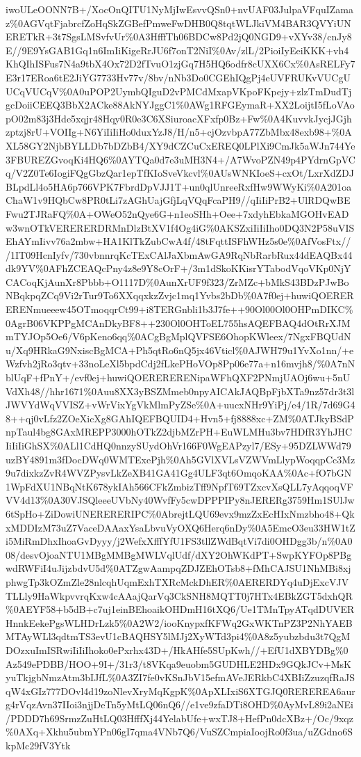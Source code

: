 \documentclass[]{article}
\begin{document}
iwoULeOONN7B+/XocOnQITU1NyMjIwEsvvQSn0+nvUAF03JulpaVFquIZamaz\%0AGVqtFjabrcfZoHqSkZGBefPmweFwDHB0Q8tqtWLJkiVM4BAR3QVYiUNERETkR+3t7SgsLMSvfvUr\%0A3HfffTh06BDCw8Pd2jQ0NGD9+vXYv38/cnJy8E//9E9YsGAB1Gq1n6ImIiKigeRrJU6f7onT2NiI\%0Av/zlL/2PioiIyEeiKKK+vh4KhQIhISFus7N4a9tbX4Ox72D2fTvuO1zjGq7H5HQ6odfr8cUXX6Cx\%0AsRELFy7E3r17ERoa6tE2JiYG7733Hv77v/8bv/nNb3Do0CGEhIQgPj4eUVFRUKvVUCgUUCqVUCqV\%0A0uPOP2UymbQIguD2vPMCdMxapVKpoFKpejy+zlzTmDudTjgcDoiiCEEQ3BbX2ACke88AkNYJggC1\%0AWg1RFGEymaR+XX2LoijtI5fLoVAopO02m83j3Hde5xqjr48Hqy0R0e3C6XSiuroacXFxfp0Bz+Fw\%0A4KuvvkJycjJGjhzptzj8rU+VOIIg+N6YiIiIiHo0duxYzJ8/H/n5+cjOzvbpA77ZbMbx48exb98+\%0AXL58GY2NjbBYLLDb7bDZbB4/XY9dCZCuCxEREQ0LPlXi9CmJk5aWJn744Ye3FBUREZGvoqKi4HQ6\%0AYTQa0d7e3uMH3N4+/A7WvoPZN49p4PYdrnGpVCq/V2Z0Te6IogiFQgGbzQar1epTfKIoSveVkcvl\%0AUsWNKIoeS+cxOt/LxrXdZDJBLpdLl4o5HA6p766VPK7FbrdDpVJJ1T+un0qlUnreeRxfHw9WWyKi\%0A201oaChaW1v9HQbCw8PR0tLi7zAGhUajGfjLqVQqFcaPH9//qIiIiPrB2+UlRDQwBEFwu2TJRaFQ\%0A+OWeO52nQye6G+n1eoSHh+Oee+7xdyhEbkaMGOHvEADw3wnOTkVERERERDRMnDlzBtXV1f4Og4iG\%0AKSZxiIiIiIho0DQ3N2P58uVISEhAYmIivv76a2mbw+HA1KlTkZubCwA4f/48tFqttISFhWHz5s0e\%0AfVosFtx///1IT09HcnIyfv/730vbnnrqKcTExCAlJaXbmAwGA9RqNbRarbRux44dEAQBx44dk9YV\%0AFhZCEAQcPny4z8e9Y8cOrF+/3m1dSkoKKisrYTabodVqoVKp0NjYCACoqKjAunXr8Pbbb+O1117D\%0AunXrUF9f323/ZrMZc+bMkS43BDzPJwBoNBqkpqZCq9Vi2rTur9To6XXqqxkzZvjc1mq1Yvbs2bDb\%0A7f0ej+huwiQOERERERENmueeew45OTmoqqrCt99+i8TERGnbli1b3J7fe++90Ol00Ol0OHPmDIKC\%0AgrB06VKPPgMCAnDkyBF8++230Ol0OHToEL755hsAQEFBAQ4dOtRrXJMmTYJOp5Oe6/V6pKeno6qq\%0ACgBgMplQVFSE6OhopKWleex/7NgxFBQUdNu/Xq9HRkaG9NxiscBgMCA+Ph5qtRo6nQ5jx46Vticl\%0AJWH79u1YvXo1nn/+eWzfvh2jRo3qtv+33noLeXl5bpdCdj2fLkePHoVOp8Pp06e77a+n16mvjh8/\%0A7nNblUqF+fPnY+/evf0ej+huwiQOERERERENipaWFhQXF2PNmjUAOj6wu+5nUVdXh48//hhr1671\%0Auu8XX3yBSZMmeb0npyAICAkJAQBpFjbXTa9nz57dr3t3lJWVYdWqVVISZ+vWrVixYgVkMlmPyZSe\%0A+uucxNHr9YiPj/e4/1R/7d69G48++qj0vLfz2ZOeXicXg8GAhIQEFBQUID4+Hvn5+fj8888xc+ZM\%0ATJkyBSdPnpTaul4bg8GAxMREPP3000hOTkZ2djbMZrPH+EuWLMHu3bv7HDfR3YhJHCIiIiIiGhSX\%0ALl1CdHQ0nnzySUydOhVr166F0WgEAPzyl7/ESy+95DZLWWd79uzBY4891m3fDocDWq0WMTExePjh\%0Ah5GVlXVLsVZWVmLlypWoqqpCc3Mz9u7dixkzZvR4WVZPysvLkZeXB41GA41Gg4ULF3qt6OmqoKAA\%0Ac+fO7bGN1WpFdXU1NBqNtK678ykIAh566CFkZmbizTff9NpfT69TZxcvXsQLL7yAqqoqVFVV4d13\%0A30VJSQleeeUVbNy40WvfFy5cwDPPPIPy8nJERERg3759Hm1SUlJw6tSpHo+ZiDowiUNERERERIPC\%0AbrejtLQU69evx9mzZxEcHIxNmzbho48+QkxMDDIzM73uZ7VaceDAAaxYsaLbvuVyOXQ6Herq6nDy\%0A5EmcO3eu33HW1tZi5MiRmDhxIhoaGvDyyy/j2WefxXfffYfU1FS3tllZWdBqtVi7di0OHDgg3b/n\%0A008/desvOjoaNTU1MBgMMBgMWLVqlUdf/dXY2OhWKdPT+SwpKYFOp8PBgwdRWFiI4uJijzbdvU5d\%0ATZgwAampqZDJZEhOTsb8+fMhCAJSU1NhMBi8xjphwgTp3kOZmZle28nlcqhUqmExhTXRcMckDhER\%0AERERDYq4uDjExcVJVTLLly9HaWkpvvrqKxw4cAAajQarVq3CkSNH8MQTT0j7HTx4EBkZGT5dxhQR\%0AEYF58+b5dB+c7uj1einBEhoaikOHDmH16tXQ6/Ue1TMnTpyATqdDUVERHnnkEekePgsWLHDrLzk5\%0A2W2/iooKnypxfKFWq2GxWKTnPZ3P2NhYAEBMTAyWLl3qdtmTS3evU1cBAQHSY5lMJj2XyWTd3pi4\%0A8z5yubzbdu3t7QgMDOzxuImISRwiIiIiIhoko0ePxrhx43D+/HkAHfe5SUpKwh//+EfU1dXBYDBg\%0Az549ePDBB/HOO+9I+/31r3/t8VKqa9euobm5GUDHLE2HDx9GQkJCv+MsKyuTkjgbNmzAtm3bIJfL\%0A3ZI7fe0vKSnJbV15efmAVeJERkbC4XBIiZzuzqfRaJSqW4xGIz777DOvl4d19zoNlevXryMqKgpK\%0ApXLIxiS6XTGJQ0REREREA6aurg4rVqzAvn37IIoi3njjDeTn5yMtLQ06nQ6//e1ve9zfaDTi8OHD\%0AyMvL89i2aNEi/PDDD7h69SrmzZuHtLQ03HfffXj44YelabUfe+wxTJ8+HefPn0dcXBz+/Oc/9xqz\%0AXq+Xkhu5ubmYPn06gI7qma4VNb7Q6/VuSZCmpiaIoojRo0f3ua/uZGdno6SkpMc29fV3Ytk
\end{document}
